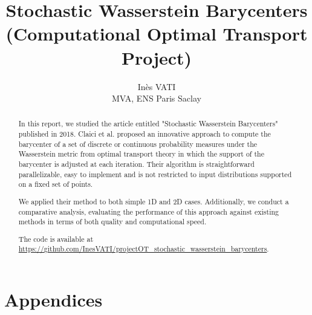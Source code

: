 \documentclass[a4paper, 11pt]{article}
\title{Stochastic Wasserstein Barycenters (Computational Optimal Transport Project)}
\author{Inès VATI \email{ines.vati@eleves.enpc.fr} \\ MVA, ENS Paris Saclay }
\begin{document}
\maketitle

\begin{abstract}
    In this report, we studied the article \cite{claici_stochastic_2018} entitled "Stochastic Wasserstein Barycenters" published in 2018. Claici et al. proposed an innovative approach to compute the barycenter of a set of discrete or continuous probability measures under the Wasserstein metric from optimal transport theory in which the support of the barycenter is adjusted at each iteration. Their algorithm is straightforward parallelizable, easy to implement and is not restricted to input distributions supported on a fixed set of points. 

We applied their method to both simple 1D and 2D cases. Additionally, we conduct a comparative analysis, evaluating the performance of this approach against existing methods in terms of both quality and computational speed. 

The code is available at \url{https://github.com/InesVATI/projectOT_stochastic_wasserstein_barycenters}. 
\end{abstract}





 






\printbibliography

\newpage
\section*{Appendices}
\end{document}
